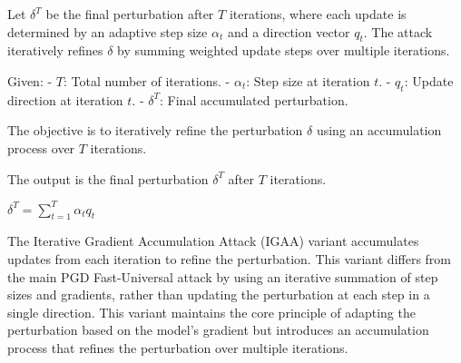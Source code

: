 Let $\delta^T$ be the final perturbation after $T$ iterations, where each update is determined by an adaptive step size $\alpha_t$ and a direction vector $q_t$. The attack iteratively refines $\delta$ by summing weighted update steps over multiple iterations.

Given:
- $T$: Total number of iterations.
- $\alpha_t$: Step size at iteration $t$.
- $q_t$: Update direction at iteration $t$.
- $\delta^T$: Final accumulated perturbation.

The objective is to iteratively refine the perturbation $\delta$ using an accumulation process over $T$ iterations.


The output is the final perturbation $\delta^T$ after $T$ iterations.

$\delta^T = \sum_{t=1}^{T} \alpha_t q_t$

The Iterative Gradient Accumulation Attack (IGAA) variant accumulates updates from each iteration to refine the perturbation. This variant differs from the main PGD Fast-Universal attack by using an iterative summation of step sizes and gradients, rather than updating the perturbation at each step in a single direction. This variant maintains the core principle of adapting the perturbation based on the model's gradient but introduces an accumulation process that refines the perturbation over multiple iterations.